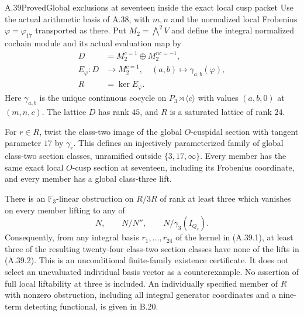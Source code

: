 \begin{statement}{A.39}{Proved}{Global exclusions at seventeen inside the exact local cusp packet}
Use the actual arithmetic basis of A.38, with $m,n$ and the
normalized local Frobenius $\varphi=\varphi_{17}$ transported
as there. Put $M_2=\bigwedge^2V$ and define the integral
normalized cochain module and its actual evaluation map by
\[
\begin{split}
 D&=M_2^{c=1}\oplus M_2^{nc=-1},\\
 E_\varphi:D&\longrightarrow M_2^{c=1},\quad
       (a,b)\longmapsto\gamma_{a,b}(\varphi),\\
 R&=\ker E_\varphi.
\end{split}
 \tag{A.39.1}
\]
Here $\gamma_{a,b}$ is the unique continuous cocycle on
$P_3\rtimes\langle c\rangle$ with values $(a,b,0)$ at
$(m,n,c)$. The lattice $D$ has rank $45$, and $R$ is a
saturated lattice of rank $24$.

For $r\in R$, twist the class-two image of the global
$O$-cuspidal section with tangent parameter $17$ by
$\gamma_r$. This defines an injectively parameterized family
of global class-two section classes, unramified outside
$\{3,17,\infty\}$. Every member has the same exact local
$O$-cusp section at seventeen, including its Frobenius
coordinate, and every member has a global class-three lift.

There is an $\mathbb F_3$-linear obstruction on $R/3R$ of
rank at least three which vanishes on every member lifting to
any of
\[
 N,\qquad N/N'',\qquad N/\gamma_3(I_{Q_c}).
 \tag{A.39.2}
\]
Consequently, from any integral basis $r_1,\ldots,r_{24}$ of
the kernel in (A.39.1), at least three of the resulting
twenty-four class-two section classes have none of the lifts
in (A.39.2). This is an unconditional finite-family existence
certificate. It does not select an unevaluated individual
basis vector as a counterexample. No assertion of full local
liftability at three is included.
An individually specified member of $R$ with nonzero
obstruction, including all integral generator coordinates
and a nine-term detecting functional, is given in B.20.
\end{statement}

